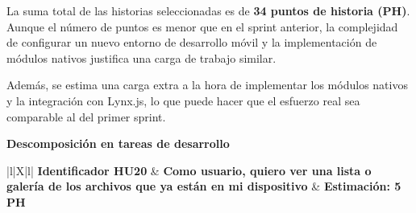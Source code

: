 La suma total de las historias seleccionadas es de \textbf{34 puntos de historia (PH)}. Aunque el número de puntos es menor que en el sprint anterior, la complejidad de configurar un nuevo entorno de desarrollo móvil y la implementación de módulos nativos justifica una carga de trabajo similar.

Además, se estima una carga extra a la hora de implementar los módulos nativos y la integración con Lynx.js, lo que puede hacer que el esfuerzo real sea comparable al del primer sprint.

\textbf{Descomposición en tareas de desarrollo}

\begin{table}[H]
    \begin{center}
        \begin{tabularx}{\textwidth}{|l|X|l|}
            \hline
            \textbf{Identificador HU20} &
            \textbf{Como usuario, quiero ver una lista o galería de los archivos que ya están en mi dispositivo} &
            \textbf{Estimación: 5 PH}\\
            \hline
\end{tabularx}
\end{center}
\end{table}
